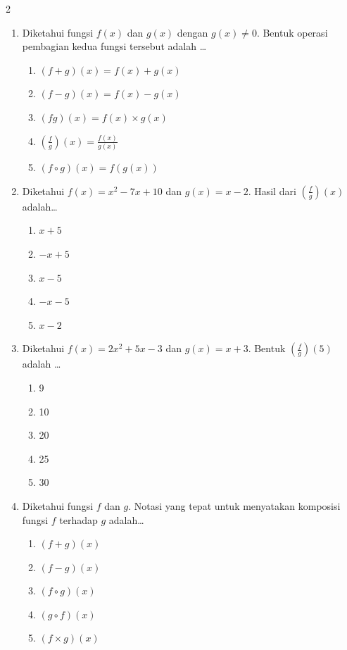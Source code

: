 \documentclass[10pt,a4paper]{article}
\begin{document}
\begin{multicols}{2}
\begin{enumerate}
    \item Diketahui fungsi $f(x)$ dan $g(x)$ dengan $g(x)\neq 0$. Bentuk operasi pembagian kedua fungsi tersebut adalah \dots
    \begin{enumerate}
        \item $(f+g)(x)=f(x)+g(x)$
        \item $(f-g)(x)=f(x)-g(x)$
        \item $(fg)(x)=f(x)\times g(x)$
        \item $\left(\frac{f}{g}\right)(x)=\frac{f(x)}{g(x)}$
        \item $(f\circ g)(x)=f(g(x))$
    \end{enumerate}

    \item Diketahui $f(x)=x^2-7x+10$ dan $g(x)=x-2$. Hasil dari $\left(\frac{f}{g}\right)(x)$ adalah\dots
    \begin{enumerate}
        \item $x+5$
        \item $-x+5$
        \item $x-5$
        \item $-x-5$
        \item $x-2$
    \end{enumerate}

    \item Diketahui $f(x)=2x^2+5x-3$ dan $g(x)=x+3$. Bentuk $\left(\frac{f}{g}\right)(5)$ adalah \dots
    \begin{enumerate}
        \item 9
        \item 10
        \item 20
        \item 25
        \item 30
    \end{enumerate}

    \item Diketahui fungsi $f$ dan $g$. Notasi yang tepat untuk menyatakan komposisi fungsi $f$ terhadap $g$ adalah\dots
    \begin{enumerate}
        \item $(f+g)(x)$
        \item $(f-g)(x)$
        \item $(f\circ g)(x)$
        \item $(g\circ f)(x)$
        \item $(f\times g)(x)$
    \end{enumerate}


\end{enumerate}
\end{multicols}
\end{document}

